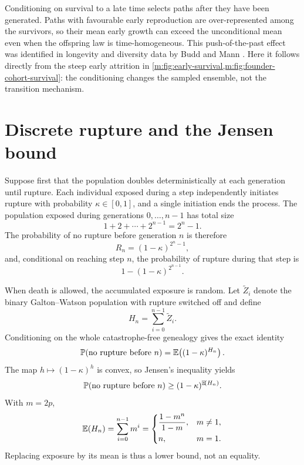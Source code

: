 Conditioning on survival to a late time selects paths after they have been
generated.  Paths with favourable early reproduction are over-represented among
the survivors, so their mean early growth can exceed the unconditional mean even
when the offspring law is time-homogeneous.  This push-of-the-past effect was
identified in longevity and diversity data by Budd and Mann
\cite{Budd2018}.  Here it follows directly from the steep early attrition in
\cref{m:fig:early-survival,m:fig:founder-cohort-survival}: the conditioning
changes the sampled ensemble, not the transition mechanism.

\section{Discrete rupture and the Jensen bound}
\label{m:app:discrete-rupture}

Suppose first that the population doubles deterministically at each generation
until rupture.  Each individual exposed during a step independently initiates
rupture with probability $\kappa\in[0,1]$, and a single initiation ends the
process.  The population exposed during generations $0,\ldots,n-1$ has total size
\[
  1+2+\cdots+2^{n-1}=2^n-1.
\]
The probability of no rupture before generation $n$ is therefore
\begin{equation}
  R_n=(1-\kappa)^{2^n-1},
  \label{m:eq:pure-birth-no-rupture}
\end{equation}
and, conditional on reaching step $n$, the probability of rupture during that
step is
\begin{equation}
  1-(1-\kappa)^{2^{n-1}}.
  \label{m:eq:rupture-at-step}
\end{equation}

When death is allowed, the accumulated exposure is random.  Let
$\widetilde Z_i$ denote the binary Galton--Watson population with rupture switched
off and define
\begin{equation}
  H_n=\sum_{i=0}^{n-1}\widetilde Z_i.
  \label{m:eq:rupture-exposure}
\end{equation}
Conditioning on the whole catastrophe-free genealogy gives the exact identity
\begin{equation}
  \mathbb{P}\!\left(\text{no rupture before }n\right)
  =\mathbb{E}\!\left((1-\kappa)^{H_n}\right).
  \label{m:eq:no-rupture-expectation}
\end{equation}
The map $h\mapsto(1-\kappa)^h$ is convex, so Jensen's inequality yields
\begin{equation}
  \mathbb{P}\!\left(\text{no rupture before }n\right)
  \geq(1-\kappa)^{\mathbb{E}\!\left(H_n\right)}.
  \label{m:eq:no-rupture-jensen}
\end{equation}
With $m=2p$,
\begin{equation}
  \mathbb{E}\!\left(H_n\right)=\sum_{i=0}^{n-1}m^i
  =
  \begin{cases}
    \dfrac{1-m^n}{1-m},&m\neq1,\\[2mm]
    n,&m=1.
  \end{cases}
  \label{m:eq:mean-rupture-exposure}
\end{equation}
Replacing exposure by its mean is thus a lower bound, not an equality.

